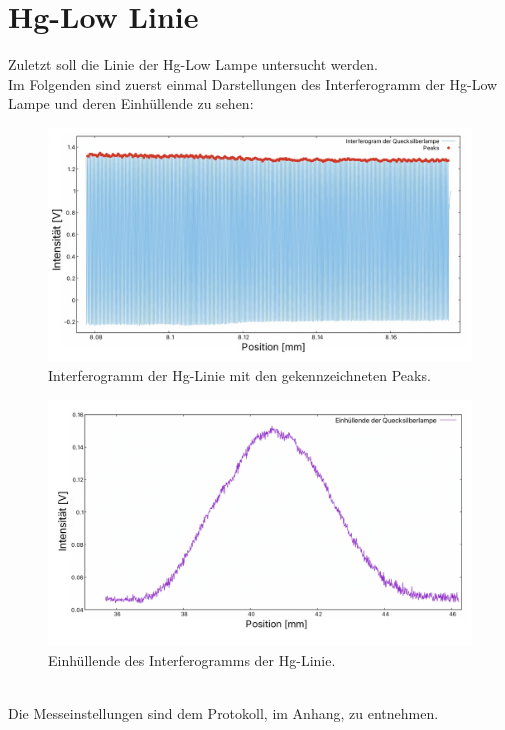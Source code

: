 \section{Hg-Low Linie}
Zuletzt soll die Linie der Hg-Low Lampe untersucht werden. \\
Im Folgenden sind zuerst einmal Darstellungen des Interferogramm der Hg-Low Lampe und 
deren Einhüllende zu sehen:\\
\begin{figure}[h]
    \centering
    \includegraphics[scale=0.28]{Bilder/Anna/Hg-Low-Interferogram.jpg}
    \caption{Interferogramm der Hg-Linie mit den gekennzeichneten Peaks.}
    \label{fig:IHgLow}
\end{figure}
\begin{figure}[h]
    \centering
    \includegraphics[scale=0.27]{Bilder/Anna/hg-low-ein.jpg}
    \caption{Einhüllende des Interferogramms der Hg-Linie.}
\end{figure}\\
Die Messeinstellungen sind dem Protokoll, im Anhang, zu entnehmen. 
\newpage
